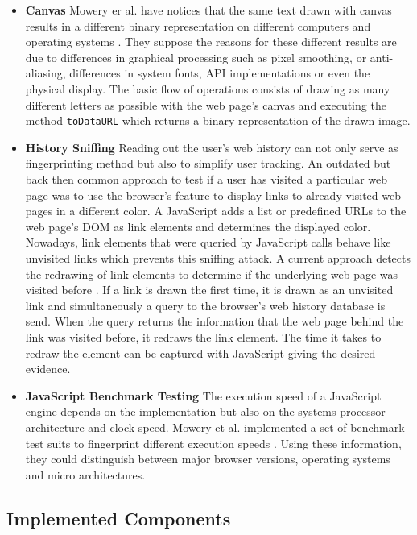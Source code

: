 \begin{itemize}
		\item \textbf{Canvas} Mowery er al. have notices that the same text drawn with canvas results in a different binary representation on different computers and operating systems \cite{MS12}. They suppose the reasons for these different results are due to differences in graphical processing such as pixel smoothing, or anti-aliasing, differences in system fonts, API implementations or even the physical display. The basic flow of operations consists of drawing as many different letters as possible with the web page's canvas and executing the method \texttt{toDataURL} which returns a binary representation of the drawn image. 
		
		\item \textbf{History Sniffing} Reading out the user's web history can not only serve as fingerprinting method but also to simplify user tracking. An outdated but back then common approach to test if a user has visited a particular web page was to use the browser's feature to display links to already visited web pages in a different color. A JavaScript adds a list or predefined URLs to the web page's DOM as link elements and determines the displayed color. Nowadays, link elements that were queried by JavaScript calls behave like unvisited links which prevents this sniffing attack. A current approach detects the redrawing of link elements to determine if the underlying web page was visited before \cite{paulstone_historysniffing}. If a link is drawn the first time, it is drawn as an unvisited link and simultaneously a query to the browser's web history database is send. When the query returns the information that the web page behind the link was visited before, it redraws the link element. The time it takes to redraw the element can be captured with JavaScript giving the desired evidence.
		
		\item \textbf{JavaScript Benchmark Testing} The execution speed of a JavaScript engine depends on the implementation but also on the systems processor architecture and clock speed. Mowery et al. implemented a set of benchmark test suits to fingerprint different execution speeds \cite{MBYS11}. Using these information, they could distinguish between major browser versions, operating systems and micro architectures. 
	\end{itemize}	
 
\subsection{Implemented Components}
 

